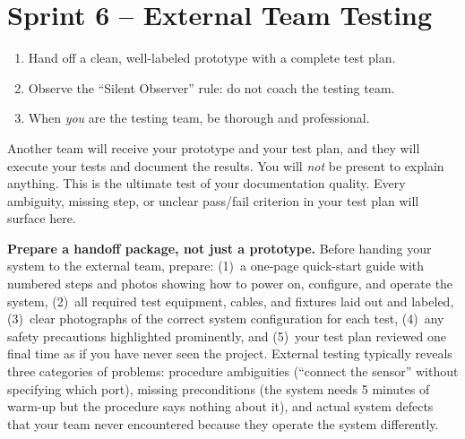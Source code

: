 \section{Sprint 6 -- External Team Testing}

\begin{priorities}
\begin{enumerate}[leftmargin=*, itemsep=1pt, topsep=0pt]
    \item Hand off a clean, well-labeled prototype with a complete test plan.
    \item Observe the ``Silent Observer'' rule: do not coach the testing team.
    \item When \textit{you} are the testing team, be thorough and professional.
\end{enumerate}
\end{priorities}

\begin{faqbox}
Another team will receive your prototype and your test plan, and they will execute your tests and document the results. You will \textit{not} be present to explain anything. This is the ultimate test of your documentation quality. Every ambiguity, missing step, or unclear pass/fail criterion in your test plan will surface here.
\end{faqbox}

\begin{tipbox}
\textbf{Prepare a handoff package, not just a prototype.} Before handing your system to the external team, prepare: (1)~a one-page quick-start guide with numbered steps and photos showing how to power on, configure, and operate the system, (2)~all required test equipment, cables, and fixtures laid out and labeled, (3)~clear photographs of the correct system configuration for each test, (4)~any safety precautions highlighted prominently, and (5)~your test plan reviewed one final time as if you have never seen the project. External testing typically reveals three categories of problems: procedure ambiguities (``connect the sensor'' without specifying which port), missing preconditions (the system needs 5 minutes of warm-up but the procedure says nothing about it), and actual system defects that your team never encountered because they operate the system differently.
\end{tipbox}

